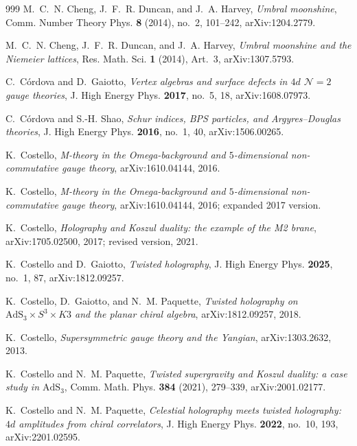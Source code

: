\documentclass[11pt]{memoir}
\begin{document}
\begin{thebibliography}{999}
M.~C.~N. Cheng, J.~F.~R. Duncan, and J.~A. Harvey, \emph{Umbral moonshine}, Comm. Number Theory Phys. \textbf{8} (2014), no.~2, 101--242, arXiv:1204.2779.

M.~C.~N. Cheng, J.~F.~R. Duncan, and J.~A. Harvey, \emph{Umbral moonshine and the Niemeier lattices}, Res. Math. Sci. \textbf{1} (2014), Art.~3, arXiv:1307.5793.

C.~C\'ordova and D.~Gaiotto, \emph{Vertex algebras and surface defects in $4d$ $\mathcal N=2$ gauge theories}, J. High Energy Phys. \textbf{2017}, no.~5, 18, arXiv:1608.07973.

C.~C\'ordova and S.-H. Shao, \emph{Schur indices, BPS particles, and Argyres--Douglas theories}, J. High Energy Phys. \textbf{2016}, no.~1, 40, arXiv:1506.00265.

K.~Costello, \emph{M-theory in the Omega-background and $5$-dimensional non-commutative gauge theory}, arXiv:1610.04144, 2016.

K.~Costello, \emph{M-theory in the Omega-background and $5$-dimensional non-commutative gauge theory}, arXiv:1610.04144, 2016; expanded 2017 version.

K.~Costello, \emph{Holography and Koszul duality: the example of the M2 brane}, arXiv:1705.02500, 2017; revised version, 2021.

K.~Costello and D.~Gaiotto, \emph{Twisted holography}, J. High Energy Phys. \textbf{2025}, no.~1, 87, arXiv:1812.09257.

K.~Costello, D.~Gaiotto, and N.~M. Paquette, \emph{Twisted holography on $\mathrm{AdS}_3 \times S^3 \times K3$ and the planar chiral algebra}, arXiv:1812.09257, 2018.

K.~Costello, \emph{Supersymmetric gauge theory and the Yangian}, arXiv:1303.2632, 2013.

K.~Costello and N.~M. Paquette, \emph{Twisted supergravity and Koszul duality: a case study in $\mathrm{AdS}_3$}, Comm. Math. Phys. \textbf{384} (2021), 279--339, arXiv:2001.02177.

K.~Costello and N.~M. Paquette, \emph{Celestial holography meets twisted holography: $4d$ amplitudes from chiral correlators}, J. High Energy Phys. \textbf{2022}, no.~10, 193, arXiv:2201.02595.


\end{thebibliography}
\end{document}
